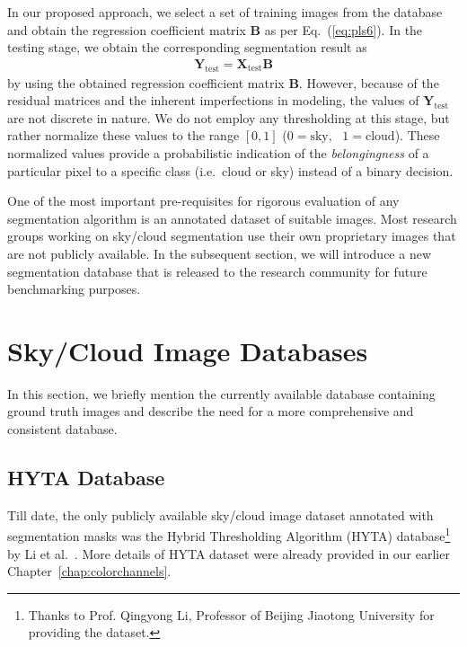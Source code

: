 In our proposed approach, we select a set of training images from the database and obtain the regression coefficient matrix $\mathbf{B}$ as per Eq.\ (\ref{eq:pls6}). In the testing stage, we obtain the corresponding segmentation result as
\begin{align}
\label{eq:testing_eqn}
\mathbf{Y}_{\mathrm{\mathrm{test}}}=\mathbf{X}_{\mathrm{\mathrm{test}}}\mathbf{B}
\end{align}
by using the obtained regression coefficient matrix $\mathbf{B}$. However, because of the residual matrices and the inherent imperfections in modeling, the values of $\mathbf{Y}_{\mathrm{\mathrm{test}}}$ are not discrete in nature. We do not employ any thresholding at this stage, but rather normalize these values to the range $[0,1]$ ($0=\mbox{sky}, \mbox{ }1=\mbox{cloud}$). 
These normalized values provide a probabilistic  indication of the \emph{belongingness} of a particular pixel to a specific class (i.e.\ cloud or sky) instead of a binary decision. 

One of the most important pre-requisites for rigorous evaluation of any segmentation algorithm is an annotated dataset of suitable images. Most research groups working on sky/cloud segmentation use their own proprietary images that are not publicly available. In the subsequent section, we will introduce a new segmentation database that is released to the research community for future benchmarking purposes. 

\section{Sky/Cloud Image Databases}
\label{sec:database}
In this section, we briefly mention the currently available database containing ground truth images and describe the need for a more comprehensive and consistent database.

\subsection{HYTA Database}
Till date, the only publicly available sky/cloud image dataset annotated with segmentation masks was the Hybrid Thresholding Algorithm (HYTA) database\footnote{Thanks to Prof. Qingyong Li, Professor of Beijing Jiaotong University for providing the dataset.} by Li et al.\ \cite{Li2011}. More details of HYTA dataset were already provided in our earlier Chapter~\ref{chap:colorchannels}.

